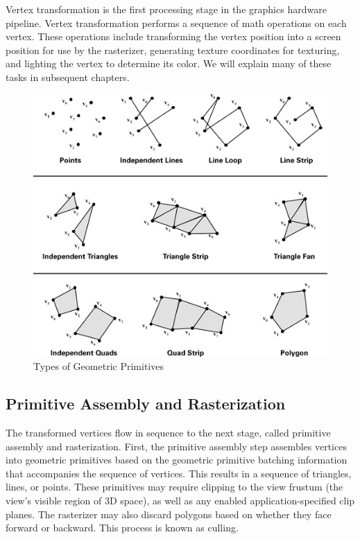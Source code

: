 \documentclass{book}
\begin{document}
Vertex transformation is the first processing stage in the graphics hardware pipeline. Vertex transformation performs a sequence of math operations on each vertex. These operations include transforming the vertex position into a screen position for use by the rasterizer, generating texture coordinates for texturing, and lighting the vertex to determine its color. We will explain many of these tasks in subsequent chapters.

\begin{figure}
    \centering
    \includegraphics[width=1\linewidth]{Images/fig1_4.jpg}
    \caption{Types of Geometric Primitives}
    \label{fig:1-4}
\end{figure}

\subsection*{Primitive Assembly and Rasterization}

The transformed vertices flow in sequence to the next stage, called primitive assembly and rasterization. First, the primitive assembly step assembles vertices into geometric primitives based on the geometric primitive batching information that accompanies the sequence of vertices. This results in a sequence of triangles, lines, or points. These primitives may require clipping to the view frustum (the view's visible region of 3D space), as well as any enabled application-specified clip planes. The rasterizer may also discard polygons based on whether they face forward or backward. This process is known as culling.
\end{document}
